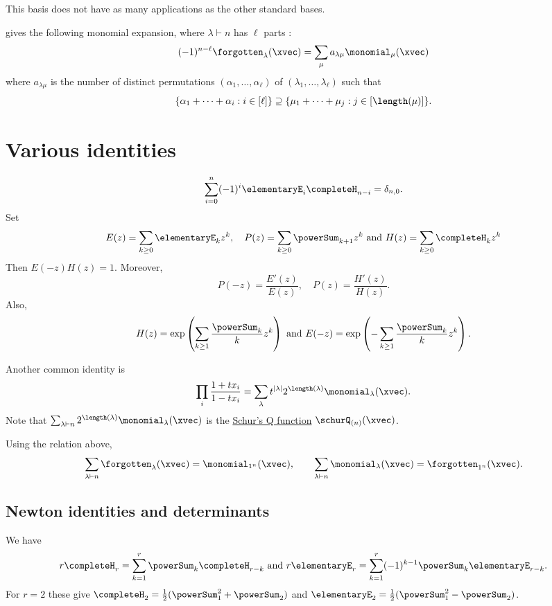 This basis does not have as many applications as the other standard bases.

 gives the following monomial expansion, where
$\lambda \vdash n$ has $\ell$ parts \cite[Ex.~7.9]{StanleyEC2}:
\begin{equation}
(-1)^{n-\ell} \forgotten_\lambda(\xvec)
=
\sum_{\mu} a_{\lambda\mu} \monomial_\mu(\xvec)
\end{equation}
where $a_{\lambda \mu}$ is the number of distinct permutations
$(\alpha_1,\dotsc,\alpha_\ell)$
of $(\lambda_1,\dotsc,\lambda_\ell)$ such that
\[
 \{ \alpha_1+ \dotsb + \alpha_i : i \in [\ell] \} \supseteq
 \{ \mu_1+ \dotsb + \mu_j : j \in [\length(\mu)] \}.
\]


\section[standardIdentities]{Various identities}

\[
\sum_{i=0}^n (-1)^i \elementaryE_i \completeH_{n-i} = \delta_{n,0}.
\]
Set
\[
E(z) = \sum_{k \geq 0} \elementaryE_k z^k, \quad
P(z) = \sum_{k \geq 0} \powerSum_{k+1} z^k
\text{ and }
H(z) = \sum_{k \geq 0} \completeH_k z^k
\]
Then $E(-z)H(z)=1$.
Moreover,
\[
  P(-z) = \frac{E'(z)}{E(z)}, \quad P(z) = \frac{H'(z)}{H(z)}.
\]
Also,
\begin{align}
H(z) = \exp\left( \sum_{k \geq 1} \frac{\powerSum_k }{k}  z^k \right)
\text{ and }
E(-z) = \exp\left( - \sum_{k \geq 1} \frac{\powerSum_k }{k} z^k \right).
\end{align}


Another common identity is
\[
 \prod_{i} \frac{1+t x_i}{1-t x_i} = \sum_{\lambda} t^{|\lambda|} 2^{\length(\lambda)} \monomial_{\lambda}(\xvec).
\]
Note that $\sum_{\lambda \vdash n} 2^{\length(\lambda)} \monomial_{\lambda}(\xvec)$ is the
\hyperref[schurQ]{Schur's Q function} $\schurQ_{(n)}(\xvec)$.

Using the relation above,
\[
  \sum_{\lambda \vdash n} \forgotten_\lambda(\xvec) = \monomial_{1^n}(\xvec), \qquad
  \sum_{\lambda \vdash n} \monomial_\lambda(\xvec) = \forgotten_{1^n}(\xvec).
\]


\subsection[standardNewton]{Newton identities and determinants}

We have
\[
r \completeH_r = \sum_{k=1}^r \powerSum_k  \completeH_{r-k}
\text{ and }
r \elementaryE_r = \sum_{k=1}^r (-1)^{k-1} \powerSum_k  \elementaryE_{r-k}.
\]
For $r=2$ these give
$\completeH_2=\tfrac12(\powerSum_1^2+\powerSum_2)$ and
$\elementaryE_2=\tfrac12(\powerSum_1^2-\powerSum_2)$.


